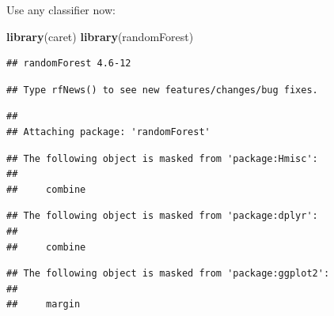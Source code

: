 \documentclass[]{book}
\newenvironment{Shaded}{\begin{snugshade}}{\end{snugshade}}
\newcommand{\KeywordTok}[1]{\textcolor[rgb]{0.13,0.29,0.53}{\textbf{{#1}}}}
\newcommand{\DataTypeTok}[1]{\textcolor[rgb]{0.13,0.29,0.53}{{#1}}}
\newcommand{\DecValTok}[1]{\textcolor[rgb]{0.00,0.00,0.81}{{#1}}}
\newcommand{\StringTok}[1]{\textcolor[rgb]{0.31,0.60,0.02}{{#1}}}
\newcommand{\OtherTok}[1]{\textcolor[rgb]{0.56,0.35,0.01}{{#1}}}
\newcommand{\NormalTok}[1]{{#1}}
\begin{document}
Use any classifier now:

\begin{Shaded}
\begin{Highlighting}[]
\KeywordTok{library}\NormalTok{(caret)}
\KeywordTok{library}\NormalTok{(randomForest)}
\end{Highlighting}
\end{Shaded}

\begin{verbatim}
## randomForest 4.6-12
\end{verbatim}

\begin{verbatim}
## Type rfNews() to see new features/changes/bug fixes.
\end{verbatim}

\begin{verbatim}
## 
## Attaching package: 'randomForest'
\end{verbatim}

\begin{verbatim}
## The following object is masked from 'package:Hmisc':
## 
##     combine
\end{verbatim}

\begin{verbatim}
## The following object is masked from 'package:dplyr':
## 
##     combine
\end{verbatim}

\begin{verbatim}
## The following object is masked from 'package:ggplot2':
## 
##     margin
\end{verbatim}

\begin{Shaded}
\end{Shaded}
\end{document}
